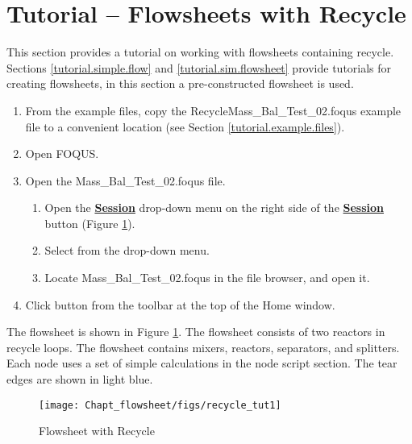 \section{Tutorial -- Flowsheets with Recycle}

This section provides a tutorial on working with flowsheets containing recycle. Sections \ref{tutorial.simple.flow} and \ref{tutorial.sim.flowsheet} provide tutorials for creating flowsheets, in this section a pre-constructed flowsheet is used.

\begin{enumerate}
	\item From the example files, copy the Recycle\bs Mass\_Bal\_Test\_02.foqus example file to a convenient location (see Section \ref{tutorial.example.files}).
	\item Open FOQUS.
\end{enumerate}
\begin{samepage}\begin{enumerate}
	\setcounter{enumi}{2}
	\item Open the Mass\_Bal\_Test\_02.foqus file.
	\begin{enumerate}
		\item Open the \textbf{\underline{Session}} drop-down menu on the right side of the \textbf{\underline{Session}} button (Figure \ref{fig.recycle.tut1}).
		\item Select  from the drop-down menu.
		\item Locate Mass\_Bal\_Test\_02.foqus in the file browser, and open it.
	\end{enumerate}
	\setcounter{enumi}{3}
	\item Click  button from the toolbar at the top of the Home window.
\end{enumerate}\end{samepage}

The flowsheet is shown in Figure \ref{fig.recycle.tut1}.  The flowsheet consists of two reactors in recycle loops.  The flowsheet contains mixers, reactors, separators, and splitters. Each node uses a set of simple calculations in the node script section. The tear edges are shown in light blue.

\begin{figure}[H]
	\begin{center}
		\texttt{[image: Chapt\_flowsheet/figs/recycle\_tut1]}
		\caption{Flowsheet with Recycle}
		\label{fig.recycle.tut1}
	\end{center}
\end{figure}

